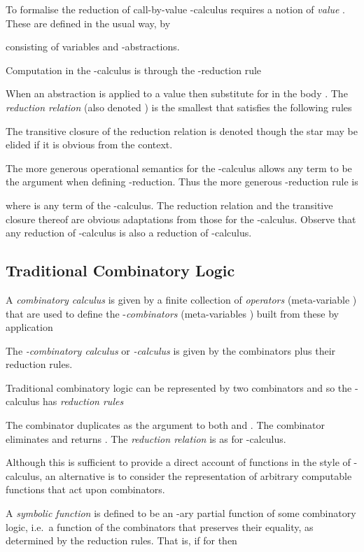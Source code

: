 \documentclass{llncs}
\begin{document}
To formalise the reduction of call-by-value -calculus requires a notion of {\em value} . These are defined in the usual way, by

consisting of variables and -abstractions.

Computation in the -calculus is through the -reduction rule

When an abstraction  is applied to a value  then substitute  for  in the body .
The {\em reduction relation} (also denoted ) is the smallest that satisfies the following rules

The transitive closure of the reduction relation is denoted  though the star may be elided if it is obvious from the context.

The more generous operational semantics for the -calculus allows any term to be the argument when defining -reduction. Thus the more generous -reduction rule is

where  is any term of the -calculus.
The reduction relation  and the transitive closure thereof  are obvious adaptations from those for the -calculus.
Observe that any reduction  of -calculus is also a reduction  of -calculus.

\subsection{Traditional Combinatory Logic}
\label{ssec:sk}

A {\em combinatory calculus} is given by a finite collection  of {\em operators} (meta-variable ) that are
used to define the -{\em combinators} (meta-variables
) built from these by application

The {\em -combinatory calculus} or {\em -calculus}
is given by the combinators plus their reduction rules.


Traditional combinatory logic can be represented by two combinators  and  \cite{Curry58combinatorylogic} so the -calculus has {\em reduction rules}

The combinator  duplicates  as the argument to both  and
.  The combinator  eliminates  and returns .
The {\em reduction relation}  is 
as for -calculus.


Although this is sufficient to provide a direct account of functions in the style
of -calculus, an alternative is to consider the representation
of arbitrary computable functions that act upon combinators.

A {\em symbolic function} is defined to be an -ary partial
function  of some combinatory logic, i.e.~a function of
the combinators that preserves their equality, as determined by the
reduction rules.  That is, if  for  then
\end{document}
